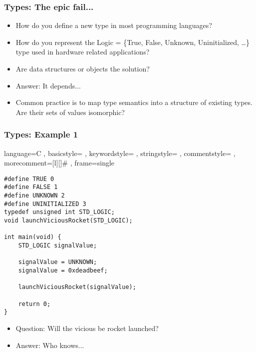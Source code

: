\documentclass[11pt]{beamer}
\begin{document}
	\begin{frame}
		\frametitle{Types: The epic fail...}
			\begin{itemize}[<+->]
				\item How do you define a new type in most programming languages?
				\item How do you represent the Logic = \{True, False, Unknown, Uninitialized, \ldots \} type used in hardware related applications?
				\item Are data structures or objects the solution?
				\item Answer: It depends...
				\item Common practice is to map type semantics into a structure of existing types. Are their sets of values isomorphic?
			\end{itemize}
	\end{frame}

\begin{frame}[fragile]
\frametitle{Types: Example 1}

\lstset
	{ language=C
	, basicstyle=\ttfamily\footnotesize
	, keywordstyle=\color{blue}\ttfamily
	, stringstyle=\color{red}\ttfamily
	, commentstyle=\color{green}\ttfamily
	, morecomment=[l][\color{magenta}]{\#}
	, frame=single
}

\begin{lstlisting}
#define TRUE 0
#define FALSE 1
#define UNKNOWN 2
#define UNINITIALIZED 3
typedef unsigned int STD_LOGIC;
void launchViciousRocket(STD_LOGIC);

int main(void) {
	STD_LOGIC signalValue;

	signalValue = UNKNOWN;
	signalValue = 0xdeadbeef;

	launchViciousRocket(signalValue);
	
	return 0;
}
\end{lstlisting}

\begin{itemize}[<+->]
	\item Question: Will the vicious be rocket launched?
	\item Answer: Who knows...
\end{itemize}
\end{frame}
\end{document}
